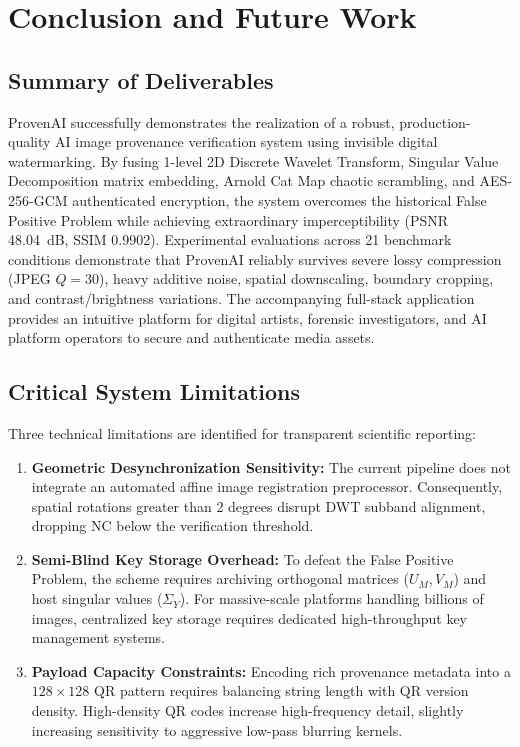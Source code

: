 \documentclass[12pt,a4paper]{report}
\begin{document}
\chapter{Conclusion and Future Work}

\section{Summary of Deliverables}
ProvenAI successfully demonstrates the realization of a robust, production-quality AI image provenance verification system using invisible digital watermarking. By fusing 1-level 2D Discrete Wavelet Transform, Singular Value Decomposition matrix embedding, Arnold Cat Map chaotic scrambling, and AES-256-GCM authenticated encryption, the system overcomes the historical False Positive Problem while achieving extraordinary imperceptibility (PSNR 48.04~dB, SSIM 0.9902). Experimental evaluations across 21 benchmark conditions demonstrate that ProvenAI reliably survives severe lossy compression (JPEG $Q=30$), heavy additive noise, spatial downscaling, boundary cropping, and contrast/brightness variations. The accompanying full-stack application provides an intuitive platform for digital artists, forensic investigators, and AI platform operators to secure and authenticate media assets.

\section{Critical System Limitations}
Three technical limitations are identified for transparent scientific reporting:
\begin{enumerate}
    \item \textbf{Geometric Desynchronization Sensitivity:} The current pipeline does not integrate an automated affine image registration preprocessor. Consequently, spatial rotations greater than 2 degrees disrupt DWT subband alignment, dropping NC below the verification threshold.
    \item \textbf{Semi-Blind Key Storage Overhead:} To defeat the False Positive Problem, the scheme requires archiving orthogonal matrices ($U_M, V_M$) and host singular values ($\Sigma_Y$). For massive-scale platforms handling billions of images, centralized key storage requires dedicated high-throughput key management systems.
    \item \textbf{Payload Capacity Constraints:} Encoding rich provenance metadata into a $128 \times 128$ QR pattern requires balancing string length with QR version density. High-density QR codes increase high-frequency detail, slightly increasing sensitivity to aggressive low-pass blurring kernels.
\end{enumerate}
\end{document}
